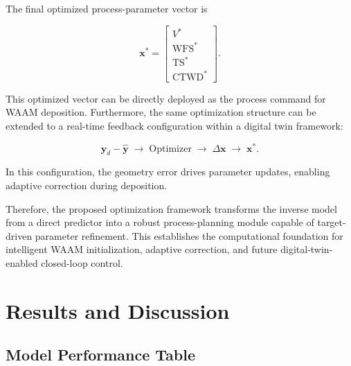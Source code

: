 \documentclass[11pt]{article}
\begin{document}
The final optimized process-parameter vector is

\begin{equation}
\mathbf{x}^{*} =
\begin{bmatrix}
V^{*} \\
\mathrm{WFS}^{*} \\
\mathrm{TS}^{*} \\
\mathrm{CTWD}^{*}
\end{bmatrix}.
\end{equation}

This optimized vector can be directly deployed as the process command for WAAM deposition. Furthermore, the same optimization structure can be extended to a real-time feedback configuration within a digital twin framework:

\begin{tcolorbox}[colback=white,colframe=black,boxrule=0.5pt,arc=2pt]
\small
\begin{equation}
\mathbf{y}_{d} - \hat{\mathbf{y}}
\;\rightarrow\;
\mathrm{Optimizer}
\;\rightarrow\;
\Delta \mathbf{x}
\;\rightarrow\;
\mathbf{x}^{*}.
\end{equation}
\end{tcolorbox}

In this configuration, the geometry error drives parameter updates, enabling adaptive correction during deposition. 

Therefore, the proposed optimization framework transforms the inverse model from a direct predictor into a robust process-planning module capable of target-driven parameter refinement. This establishes the computational foundation for intelligent WAAM initialization, adaptive correction, and future digital-twin-enabled closed-loop control.

\section{Results and Discussion}

\subsection{Model Performance Table}
\end{document}
